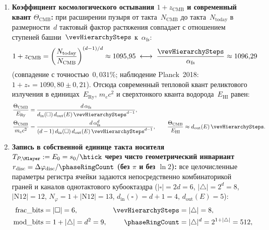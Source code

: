 \begin{theorem}
\begin{enumerate}[leftmargin=*]
\item \textbf{Коэффициент космологического остывания $1 + z_{\mathrm{CMB}}$ и современный квант $\Theta_{\mathrm{CMB}}$:}
  при расширении пузыря от такта~$N_{\mathrm{CMB}}$ до такта~$N_{\mathrm{today}}$ в размерности~$d$ тактовый фактор растяжения совпадает с отношением ступеней башни~$\vevHierarchySteps$ к~$\alpha_{\mathrm{fs}}$:
  \begin{equation}
  \label{eq:cosmo-redshift-dilation}
    1 + z_{\mathrm{CMB}}
    = \left(\frac{N_{\mathrm{today}}}{N_{\mathrm{CMB}}}\right)^{(d-1)/d}
    \approx 1095{,}95
    \;\longleftrightarrow\;
    \frac{\vevHierarchySteps}{\alpha_{\mathrm{fs}}}
    \approx 1096{,}29
  \end{equation}
  (совпадение с точностью~$0{,}031\%$; наблюдение Planck~2018: $1 + z_* = 1090{,}80 \pm 0{,}21$).
  Отсюда современный тепловой квант реликтового излучения в единицах~$E_{\mathrm{Ry}}$, $m_e c^2$ и сверхтонкого кванта водорода~$E_{\mathrm{HI}}$ равен:
  \begin{equation}
  \label{eq:cosmo-theta-cmb-natural}
  \begin{aligned}
    \frac{\Theta_{\mathrm{CMB}}}{E_{\mathrm{Ry}}}
    &= \frac{d\,\alpha_{\mathrm{fs}}}{d_{\mathrm{in}}(\square)\,d_{\mathrm{out}}(E)\,\vevHierarchySteps^{d-1}},\\
    \frac{\Theta_{\mathrm{CMB}}}{m_e c^2}
    &= \frac{d\,\alpha_{\mathrm{fs}}^{d}}{(d-1)\,d_{\mathrm{in}}(\square)\,d_{\mathrm{out}}(E)\,\vevHierarchySteps^{d-1}},
    \qquad
    \frac{\Theta_{\mathrm{CMB}}}{E_{\mathrm{HI}}}
    \approx d_{\mathrm{out}}(E)\,\vevHierarchySteps.
  \end{aligned}
  \end{equation}
\item \textbf{Запись в собственной единице такта носителя $T_{P,\Mlayer} := E_0 = s_0/\htick$ через чисто геометрический инвариант $r_{\mathrm{disc}} = \Delta\varphi_{\mathrm{disc}}/\phaseRingCount$ (без $\pi$ и без $\ln 2$):}
  все целочисленные параметры регистра ячейки задаются непосредственно комбинаторикой граней и каналов однотактового кубооктаэдра ($|\square|=2d=6$, $|\triangle|=2^d=8$, $|\mathrm{N12}|=12$, $N_\varphi=1+|\mathrm{N12}|=13$, $d_{\mathrm{in}}(\square)=d+1=4$, $d_{\mathrm{out}}(E)=5$):
  \[
  \begin{aligned}
    \mathrm{frac\_bits} &= |\square| = 6, &
    \vevHierarchySteps &= |\triangle| = 8,\\
    \mathrm{mod\_bits} &= 1 + |\triangle| = d^2 = 9, &
    \phaseRingCount &= |\triangle|^d = 2^{1+|\triangle|} = 512,

\end{aligned}\]
\end{enumerate}
\end{theorem}
